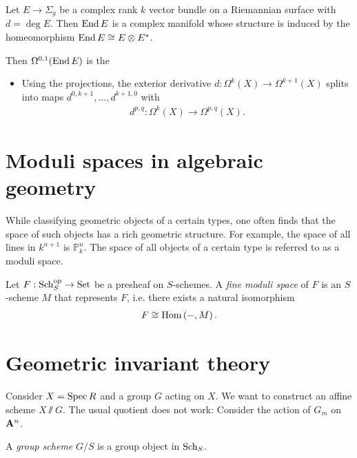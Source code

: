 \documentclass{article}
\begin{document}
\begin{example}
  Let $E\to\Sigma_g$ be a complex rank $k$ vector bundle
  on a Riemannian surface with $d=\deg E$. Then $\operatorname{End} E$ is
  a complex manifold whose structure is induced by the
  homeomorphism $\operatorname{End} E \cong E\otimes E^*$.

  Then $\Omega^{0,1}(\operatorname{End} E)$ is the
\end{example}

\begin{itemize}
  \item Using the projections, the exterior derivative $d:\Omega^k(X)\to\Omega^{k+1}(X)$ splits into maps $d^{0,k+1},\ldots,d^{k+1,0}$ with
    \begin{align*}
      d^{p,q} : \Omega^k(X) \to \Omega^{p,q}(X).
    \end{align*}
\end{itemize}

\section{Moduli spaces in algebraic geometry}

While classifying geometric objects of a certain types, one often
finds that the space of such objects has a rich geometric structure.
For example, the space of all lines in $k^{n+1}$ is
$\mathbb{P}^n_k$. The space of all objects of a certain type is referred
to as a moduli space. \cite{bejleri2020}

\begin{definition}
  Let $F:{\operatorname{Sch}}^\text{op}_S\to\operatorname{Set}$ be a presheaf on $S$-schemes.
  A \emph{fine moduli space} of $F$ is an $S$-scheme $M$ that
  represents $F$, i.e. there exists a natural isomorphism
  \begin{align*}
    F \cong \operatorname{Hom}\left({-,M}\right).
  \end{align*}
\end{definition}

\section{Geometric invariant theory}

Consider $X=\operatorname{Spec} R$ and a group $G$ acting on $X$. We want to construct
an affine scheme $X \sslash G$. The usual quotient does not work:
Consider the action of $G_m$ on $\mathbf{A}^{n}_{}$.

\begin{definition}
  A \emph{group scheme} $G/S$ is a group object in $\operatorname{Sch}_S$.
\end{definition}
\end{document}
